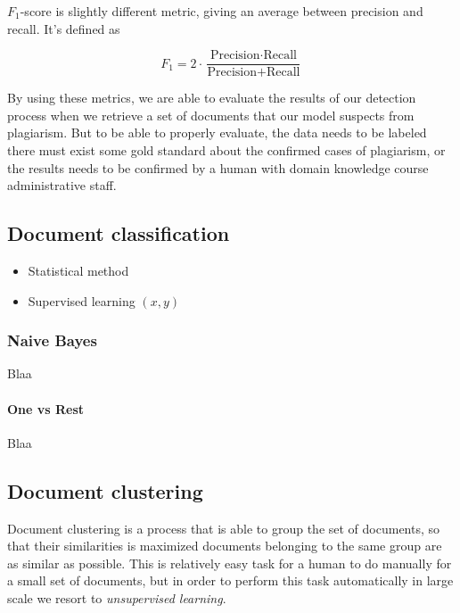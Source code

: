 $F_1$-score is slightly different metric, giving an average between precision and recall. It's defined as

\begin{equation}
    F_1 = 2 \cdot \dfrac{\text{Precision} \cdot \text{Recall}}{\text{Precision} + \text{Recall}}
\end{equation}

By using these metrics, we are able to evaluate the results of our detection process when we retrieve a set of documents that our model suspects from plagiarism. But to be able to properly evaluate, the data needs to be labeled \ie there must exist some gold standard about the confirmed cases of plagiarism, or the results needs to be confirmed by a human with domain knowledge \eg course administrative staff. 

\subsection{Document classification}

\begin{itemize}
    \item Statistical method
    \item Supervised learning $(x, y)$
\end{itemize}

\subsubsection{Naive Bayes}
Blaa

\paragraph{One vs Rest}
Blaa
\clearpage
\clearpage

\subsection{Document clustering}

Document clustering is a process that is able to group the set of documents, so that their similarities is maximized \ie documents belonging to the same group are as similar as possible. This is relatively easy task for a human to do manually for a small set of documents, but in order to perform this task automatically in large scale we resort to \emph{unsupervised learning}. 

